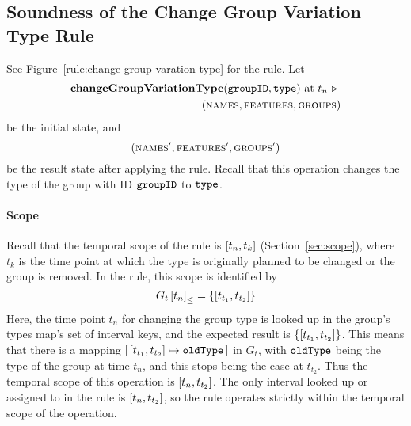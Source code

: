 

\subsection{Soundness of the Change Group Variation Type Rule} 
\label{sub:soundness-of-the-change-group-variation-type-rule}

See Figure~\vref{rule:change-group-varation-type} for the  rule. Let 
\begin{equation*}
   \begin{split}
      \textbf{changeGroupVariationType}(\texttt{groupID}, \texttt{type}) \text{ at } t_n \ \triangleright \  \\
      (\textsc{names}, \textsc{features}, \textsc{groups}{})
   \end{split}
\end{equation*}
be the initial state, and
\[
   (\textsc{names}', \textsc{features}', \textsc{groups}{}')
\]
be the result state after applying the  rule. Recall that this operation changes the type of the group with ID $\texttt{groupID}$ to $\texttt{type}$.

\paragraph{Scope}
Recall that the temporal scope of the  rule is $\interval{t_n}{t_k}$ (Section~\vref{sec:scope}), where $t_k$ is the time point at which the type is originally planned to be changed or the group is removed. In the rule, this scope is identified by 
   \[
      \containing{G_t}{t_n} = \set{\interval{t_{t_1}}{t_{t_2}}}
   \]
   Here, the time point $t_n$ for changing the group type is looked up in the group's types map's set of interval keys, and the expected result is $\set{\interval{t_{t_1}}{t_{t_2}}}$. This means that there is a mapping $\intervalmapping{t_{t_1}}{t_{t_2}}{\var{oldType}}$ in $G_t$, with $\texttt{oldType}$ being the type of the group at time $t_n$, and this stops being the case at $t_{t_2}$. Thus the temporal scope of this operation is $\interval{t_n}{t_{t_2}}$. The only interval looked up or assigned to in the rule is $\interval{t_n}{t_{t_2}}$, so the rule operates strictly within the temporal scope of the operation.

